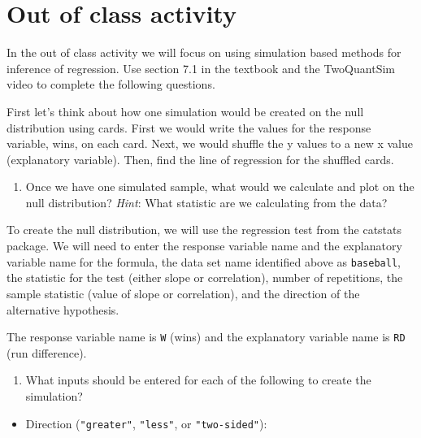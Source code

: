 \documentclass[
]{report}
\providecommand{\tightlist}{%
  \setlength{\itemsep}{0pt}\setlength{\parskip}{0pt}}
\begin{document}
\vspace{1in}

\hypertarget{out-of-class-activity}{%
\section{Out of class activity}\label{out-of-class-activity}}

In the out of class activity we will focus on using simulation based methods for inference of regression. Use section 7.1 in the textbook and the TwoQuantSim video to complete the following questions.

First let's think about how one simulation would be created on the null distribution using cards. First we would write the values for the response variable, wins, on each card. Next, we would shuffle the y values to a new x value (explanatory variable). Then, find the line of regression for the shuffled cards.

\begin{enumerate}
\def\labelenumi{\arabic{enumi}.}
\tightlist
\item
  Once we have one simulated sample, what would we calculate and plot on the null distribution? \emph{Hint}: What statistic are we calculating from the data?
\end{enumerate}

\vspace{1in}

To create the null distribution, we will use the regression test from the catstats package. We will need to enter the response variable name and the explanatory variable name for the formula, the data set name identified above as \texttt{baseball}, the statistic for the test (either slope or correlation), number of repetitions, the sample statistic (value of slope or correlation), and the direction of the alternative hypothesis.

The response variable name is \texttt{W} (wins) and the explanatory variable name is \texttt{RD} (run difference).

\begin{enumerate}
\def\labelenumi{\arabic{enumi}.}
\setcounter{enumi}{1}
\tightlist
\item
  What inputs should be entered for each of the following to create the simulation?
\end{enumerate}

\vspace{.5 mm}

\begin{itemize}
\tightlist
\item
  Direction (\texttt{"greater"}, \texttt{"less"}, or \texttt{"two-sided"}):
\end{itemize}
\end{document}
